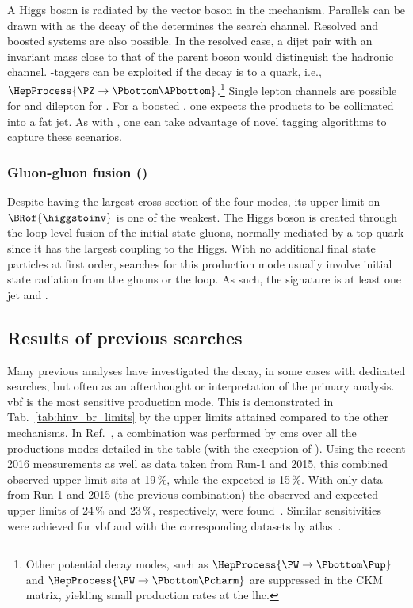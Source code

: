 A Higgs boson is radiated by the vector boson \PVec in the \VH mechanism. Parallels can be drawn with \ttH as the decay of the \PVec determines the search channel. Resolved and boosted systems are also possible. In the resolved case, a dijet pair with an invariant mass close to that of the parent boson would distinguish the hadronic channel. \Pbottom-taggers can be exploited if the decay is to a \Pbottom quark, i.e., $\HepProcess{\PZ \to \Pbottom\APbottom}$.\footnote{Other potential decay modes, such as $\HepProcess{\PW \to \Pbottom\Pup}$ and $\HepProcess{\PW \to \Pbottom\Pcharm}$ are suppressed in the CKM matrix, yielding small production rates at the \acrshort{lhc}.} Single lepton channels are possible for \WH and dilepton for \ZH. For a boosted \PVec, one expects the products to be collimated into a fat \gls{jet}. As with \ttH, one can take advantage of novel tagging algorithms to capture these scenarios. 




\subsubsection{Gluon-gluon fusion (\texorpdfstring{\ggH}{ggH})}
\label{subsubsec:theory_hinv_ggF_mode}

Despite \ggH having the largest cross section of the four modes, its upper limit on $\BRof{\higgstoinv}$ is one of the weakest. The Higgs boson is created through the loop-level fusion of the initial state gluons, normally mediated by a top quark since it has the largest coupling to the Higgs. With no additional final state particles at first order, searches for this production mode usually involve initial state radiation from the gluons or the loop. As such, the signature is at least one \gls{jet} and \ptvecmiss.




\subsection{Results of previous searches}
\label{subsec:theory_hinv_prev_results}

Many previous analyses have investigated the \higgstoinv decay, in some cases with dedicated searches, but often as an afterthought or interpretation of the primary analysis. \acrshort{vbf} is the most sensitive production mode. This is demonstrated in Tab.~\ref{tab:hinv_br_limits} by the upper limits attained compared to the other mechanisms. In Ref.~, a combination was performed by \acrshort{cms} over all the productions modes detailed in the table (with the exception of \ttH). Using the recent 2016 measurements as well as data taken from Run-1 and 2015, this combined observed upper limit sits at 19\,\%, while the expected is 15\,\%. With only data from Run-1 and 2015 (the previous combination) the observed and expected upper limits of 24\,\% and 23\,\%, respectively, were found~\cite{Khachatryan:2016whc}. Similar sensitivities were achieved for \acrshort{vbf} and \ttH with the corresponding datasets by \acrshort{atlas}~\cite{ATLAS:2020kdi}.

